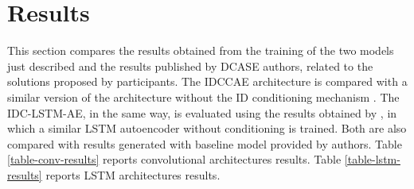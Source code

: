 \section{Results}
This section compares the results obtained from the training of the two models just described and the results published by DCASE authors, related to the solutions proposed by participants. The IDCCAE architecture is compared with a similar version of the architecture without the ID conditioning mechanism \cite{15DeepDenseConvAE}. The IDC-LSTM-AE, in the same way, is evaluated using the results obtained by \cite{16LSTMDeepAutoencodersForASDtask}, in which a similar LSTM autoencoder without conditioning is trained. Both are also compared with results generated with baseline model provided by authors. Table \ref{table-conv-results} reports convolutional architectures results. Table \ref{table-lstm-results} reports LSTM architectures results.

